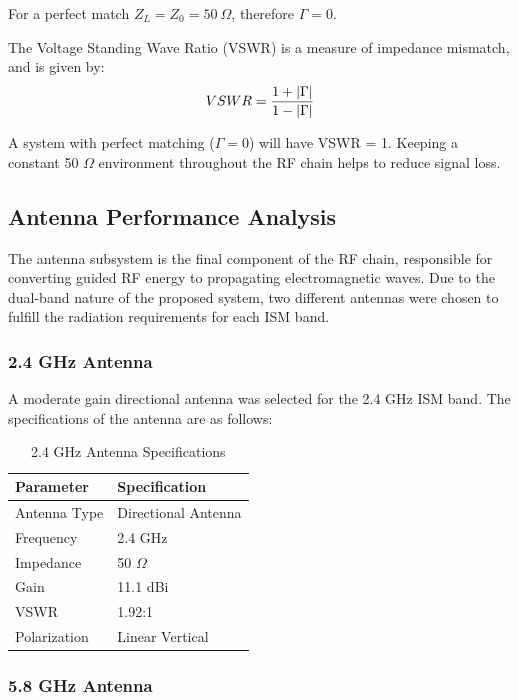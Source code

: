 \documentclass[12pt,a4paper]{report}
\begin{document}
	For a perfect match $Z_L = Z_0 = 50\ \Omega$, therefore $\Gamma = 0$.
	
	The Voltage Standing Wave Ratio (VSWR) is a measure of impedance mismatch, and is given by:
	\begingroup
	\setlength{\mathindent}{0pt}
	\begin{equation*}
		\hfill
		VSWR = \frac{1 + |\Gamma|}{1 - |\Gamma|}
		\hfill
	\end{equation*}
	\endgroup
	
	A system with perfect matching ($\Gamma = 0$) will have VSWR = 1. Keeping a constant 50 $\Omega$ environment throughout the RF chain helps to reduce signal loss.
	\subsection{Antenna Performance Analysis}
	The antenna subsystem is the final component of the RF chain, responsible for converting guided RF energy to propagating electromagnetic waves. Due to the dual-band nature of the proposed system, two different antennas were chosen to fulfill the radiation requirements for each ISM band.
	\subsubsection{2.4 GHz Antenna}
	
	A moderate gain directional antenna was selected for the 2.4 GHz ISM band. The specifications of the antenna are as follows:
	
	\begin{table}[htbp]
		\centering
		\caption{2.4 GHz Antenna Specifications}
		\label{tab:ant_2.4}
		\begin{tabular}{p{5cm} p{5cm}}
			\toprule
			\textbf{Parameter} & \textbf{Specification} \\
			\midrule
			Antenna Type & Directional Antenna \\
			Frequency & 2.4 GHz \\
			Impedance & 50 $\Omega$ \\
			Gain & 11.1 dBi \\
			VSWR & 1.92:1 \\
			Polarization & Linear Vertical \\
			\bottomrule
		\end{tabular}
	\end{table}
	
	\subsubsection{5.8 GHz Antenna}
	
\end{document}

